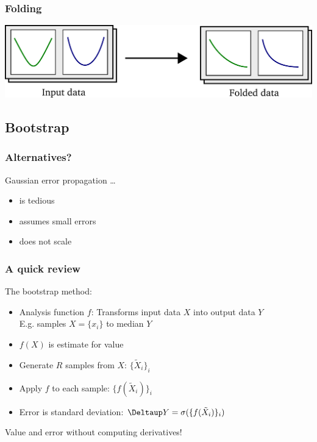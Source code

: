 \documentclass[english, fleqn]{beamer}
\begin{document}
\begin{frame}
    \frametitle{Folding}
    \begin{center}
        \includegraphics[scale=\scale]{sketches/02-folding.pdf}
    \end{center}
\end{frame}

\subsection{Bootstrap}

\begin{frame}
    \frametitle{Alternatives?}
    Gaussian error propagation …
    \begin{itemize}
        \item
            is tedious
        \item
            assumes small errors
        \item
            does not scale
    \end{itemize}
\end{frame}

\begin{frame}
    \frametitle{A quick review}
    The bootstrap method:
    \begin{itemize}
        \item
            Analysis function $f$: Transforms input data $X$ into output data
            $Y$ \\
            E.g. samples $X = \{x_i\}$ to median $Y$
        \item
            $f(X)$ is estimate for value
        \item
            Generate $R$ samples from $X$: $\{\tilde X_i\}_i$
        \item
            Apply $f$ to each sample: $\{f(\tilde X_i)\}_i$
        \item
            Error is standard deviation: $\Deltaup Y = \sigma(\{f(\tilde X_i)\}_i)$
    \end{itemize}

    Value and error without computing derivatives!
\end{frame}
\end{document}
